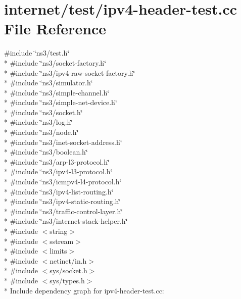 \hypertarget{ipv4-header-test_8cc}{}\section{internet/test/ipv4-\/header-\/test.cc File Reference}
\label{ipv4-header-test_8cc}
{\ttfamily \#include \char`\"{}ns3/test.\+h\char`\"{}}\\*
{\ttfamily \#include \char`\"{}ns3/socket-\/factory.\+h\char`\"{}}\\*
{\ttfamily \#include \char`\"{}ns3/ipv4-\/raw-\/socket-\/factory.\+h\char`\"{}}\\*
{\ttfamily \#include \char`\"{}ns3/simulator.\+h\char`\"{}}\\*
{\ttfamily \#include \char`\"{}ns3/simple-\/channel.\+h\char`\"{}}\\*
{\ttfamily \#include \char`\"{}ns3/simple-\/net-\/device.\+h\char`\"{}}\\*
{\ttfamily \#include \char`\"{}ns3/socket.\+h\char`\"{}}\\*
{\ttfamily \#include \char`\"{}ns3/log.\+h\char`\"{}}\\*
{\ttfamily \#include \char`\"{}ns3/node.\+h\char`\"{}}\\*
{\ttfamily \#include \char`\"{}ns3/inet-\/socket-\/address.\+h\char`\"{}}\\*
{\ttfamily \#include \char`\"{}ns3/boolean.\+h\char`\"{}}\\*
{\ttfamily \#include \char`\"{}ns3/arp-\/l3-\/protocol.\+h\char`\"{}}\\*
{\ttfamily \#include \char`\"{}ns3/ipv4-\/l3-\/protocol.\+h\char`\"{}}\\*
{\ttfamily \#include \char`\"{}ns3/icmpv4-\/l4-\/protocol.\+h\char`\"{}}\\*
{\ttfamily \#include \char`\"{}ns3/ipv4-\/list-\/routing.\+h\char`\"{}}\\*
{\ttfamily \#include \char`\"{}ns3/ipv4-\/static-\/routing.\+h\char`\"{}}\\*
{\ttfamily \#include \char`\"{}ns3/traffic-\/control-\/layer.\+h\char`\"{}}\\*
{\ttfamily \#include \char`\"{}ns3/internet-\/stack-\/helper.\+h\char`\"{}}\\*
{\ttfamily \#include $<$string$>$}\\*
{\ttfamily \#include $<$sstream$>$}\\*
{\ttfamily \#include $<$limits$>$}\\*
{\ttfamily \#include $<$netinet/in.\+h$>$}\\*
{\ttfamily \#include $<$sys/socket.\+h$>$}\\*
{\ttfamily \#include $<$sys/types.\+h$>$}\\*
Include dependency graph for ipv4-\/header-\/test.cc\+:
